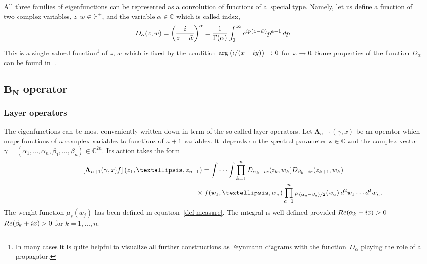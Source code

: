 \documentclass[11pt]{article}
\numberwithin{equation}{section}
\numberwithin{equation}{section}
\begin{document}
All three families of eigenfunctions can be represented as a convolution of functions of a~special type. Namely, let us define a
function of two complex variables, $z,w\in \mathbb H^+$, and the variable $\alpha\in \mathbb C$ which is called index,
\begin{gather*}%
 D_{\alpha}(z, w)=\bigg(\frac{\rm i}{z-\bar w}\bigg)^\alpha=\frac{1}{\Gamma(\alpha)}
 \int_0^{\infty} {\rm e}^{{\rm i}p\,(z-\bar w)} p^{\alpha-1} \, {\rm d}p.
\end{gather*}
This is a single valued function\footnote{In many cases it is quite helpful to
visualize all further constructions as Feynmann diagrams with the func\-tion~$D_\alpha$ playing the role of a propagator.} of $z$, $w$ which is
fixed by the condition $\arg\big({\rm i}/(x+{\rm i}y)\big)\to 0$ for~$x\to 0$. Some properties of the function $D_\alpha$ can be found in~\cite{DMspinchainandSL2RGustafson}.

\subsection[BN operator]{$\boldsymbol{B_N}$ operator}%

\subsubsection{Layer operators}

The eigenfunctions can be most conveniently written down in term of the so-called layer ope\-ra\-tors. Let $\boldsymbol\Lambda_{n+1}(\gamma,x)$
be an operator which maps functions of $n$ complex variables to functions of $n+1$ variables. It~depends on the spectral parameter
$x\in\mathbb C$ and the complex vector $\gamma=(\alpha_1,\dots,\alpha_{n}, \beta_1,\dots,\beta_n) \in \mathbb{C}^{2n}$. Its action takes
the form
\begin{gather*}%
\left[\boldsymbol\Lambda_{n+1}(\gamma,x) f\right](z_1,\dots,z_{n+1}) =
\idotsint \prod_{k=1}^{n} D_{\alpha_k-{\rm i}x}(z_k,w_k) D_{\beta_{k}+{\rm i}x}(z_{k+1},w_k)\notag
\\ \hphantom{\left[\boldsymbol\Lambda_{n+1}(\gamma,x) f\right](z_1,\dots,z_{n+1}) =\idotsint}
{}\times f(w_1,\dots,w_{n})\prod_{a=1}^n
\mu_{{(\alpha_a+\beta_{a})}/2}(w_a)
\,{\rm d}^2w_1\cdots {\rm d}^2w_n.
\end{gather*}
The weight function $\mu_{s}(w_j)$ has been defined in equation~\eqref{def-measure}. The integral is well defined provided
$\mathop{\rm Re}(\alpha_k-{\rm i}x)>0$, $\mathop{\rm Re}(\beta_{k}+{\rm i}x)>0$ for $k=1,\dots,n$.
\end{document}
